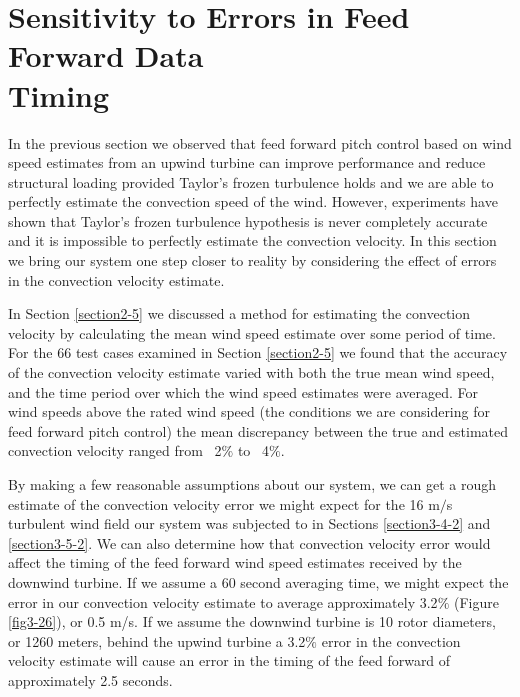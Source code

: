 
\section{Sensitivity to Errors in Feed Forward Data \\
		Timing}  \label{section3-6}
In the previous section we observed that feed forward pitch control based on wind speed estimates from an upwind turbine can improve performance and reduce structural loading provided Taylor's frozen turbulence holds and we are able to perfectly estimate the convection speed of the wind. However, experiments have shown that Taylor's frozen turbulence hypothesis is never completely accurate and it is impossible to perfectly estimate the convection velocity. In this section we bring our system one step closer to reality by considering the effect of errors in the convection velocity estimate.

In Section \ref{section2-5} we discussed a method for estimating the convection velocity by calculating the mean wind speed estimate over some period of time. For the 66 test cases examined in Section \ref{section2-5} we found that the accuracy of the convection velocity estimate varied with both the true mean wind speed, and the time period over which the wind speed estimates were averaged. For wind speeds above the rated wind speed (the conditions we are considering for feed forward pitch control) the mean discrepancy between the true and estimated convection velocity ranged from ~2$\%$ to ~4$\%$.

By making a few reasonable assumptions about our system, we can get a rough estimate of the convection velocity error we might expect for the 16 m$/$s turbulent wind field our system was subjected to in Sections \ref{section3-4-2} and \ref{section3-5-2}. We can also determine how that convection velocity error would affect the timing of the feed forward wind speed estimates received by the downwind turbine. If we assume a 60 second averaging time, we might expect the error in our convection velocity estimate to average approximately 3.2$\%$ (Figure \ref{fig3-26}), or 0.5 m/s. If we assume the downwind turbine is 10 rotor diameters, or 1260 meters, behind the upwind turbine a 3.2$\%$ error in the convection velocity estimate will cause an error in the timing of the feed forward of approximately 2.5 seconds.


